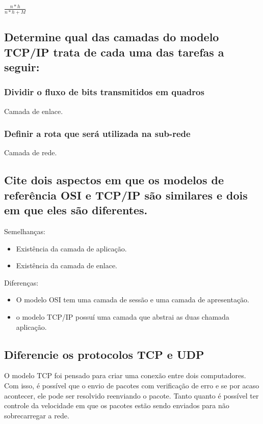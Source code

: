 \begin{center}
    {\huge $\frac{n * h}{n * h + M}$}
\end{center}

\subsection{Determine qual das camadas do modelo TCP/IP trata de cada uma
das tarefas a seguir:}

\subsubsection{Dividir o fluxo de bits transmitidos em quadros}

Camada de enlace.

\subsubsection{Definir a rota que será utilizada na sub-rede}

Camada de rede.

\subsection{Cite dois aspectos em que os modelos de referência OSI e TCP/IP
são similares e dois em que eles são diferentes.}

Semelhanças:
\begin{itemize}
    \item Existência da camada de aplicação.
    \item Existência da camada de enlace.
\end{itemize}

Diferenças:
\begin{itemize}
    \item O modelo OSI tem uma camada de sessão e uma camada de apresentação.
    \item o modelo TCP/IP possuí uma camada que abstrai as duas chamada aplicação.
\end{itemize}

\subsection{Diferencie os protocolos TCP e UDP}

O modelo TCP foi pensado para criar uma conexão entre dois computadores.
Com isso, é possível que o envio de pacotes com verificação de erro e se
por acaso acontecer, ele pode ser resolvido reenviando o pacote. Tanto quanto
é possível ter controle da velocidade em que os pacotes estão sendo enviados
para não sobrecarregar a rede. 


